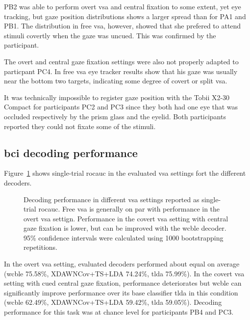 PB2 was able to perform overt \ac{vsa} and central fixation to some extent,
yet eye tracking, but gaze position distributions shows a larger spread than
for PA1 and PB1.
The distribution in free \ac{vsa}, however, showed that she prefered to attend
stimuli covertly when the gaze was uncued.
This was confirmed by the participant.

The overt and central gaze fixation settings were also not properly adapted to
particpant PC4.
In free \ac{vsa} eye tracker results show that his gaze was usually near the
bottom two targets, indicating some degree of covert or split \ac{vsa}.

It was technically impossible to register gaze position with the Tobii X2-30
Compact for participants PC2 and PC3 since they both had one eye that was
occluded respectively by the prism glass and the eyelid.
Both participants reported they could not fixate some of the
stimuli.

\subsection{\Acs{bci} decoding performance}

Figure~\ref{fig:patients/decode} shows single-trial
\ac{rocauc} in the evaluated \ac{vsa} settings fort the different decoders.

\begin{figure}[t]
  
  \caption[%
    Decoding performance in different \acs{vsa} settings.
  ]{%
    Decoding performance in different \ac{vsa} settings reported as
    single-trial \ac{rocauc}.
    Free \ac{vsa} is generally on par with performance in the overt \ac{vsa}
    settign.
    Performance in the covert \ac{vsa} setting with central gaze fixation is lower, but can
    be improved with the \ac{wcble} decoder.
    95\% confidence intervals were calculated using 1000 bootstrapping
    repetitions.
  }
  \label{fig:patients/decode}
\end{figure}

In the overt \ac{vsa} setting, evaluated decoders performed about equal on average
(\ac{wcble} 75.58\%, XDAWNCov+TS+LDA 74.24\%, \ac{tlda} 75.99\%).
In the covert \ac{vsa} setting with cued central gaze fixation, performance deteriorates
but \ac{wcble} can significantly improve performance over its base classifier
\ac{tlda} in this condition
(\ac{wcble} 62.49\%, XDAWNCov+TS+LDA 59.42\%, \ac{tlda} 59.05\%).
Decoding performance for this task was at chance level for participants PB4 and
PC3.

